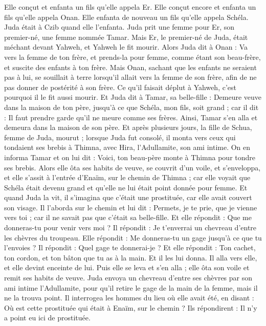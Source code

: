 \begin{multicols}{2}
Elle conçut et enfanta un fils qu'elle appela Er.
Elle conçut encore et enfanta un fils qu'elle appela Onan.
Elle enfanta de nouveau un fils qu'elle appela Schéla. Juda était à Czib quand elle l'enfanta.
Juda prit une femme pour Er, son premier-né, une femme nommée Tamar.
Mais Er, le premier-né de Juda, était méchant devant Yahweh, et Yahweh le fit mourir.
Alors Juda dit à Onan : Va vers la femme de ton frère, et prends-la pour femme, comme étant son beau-frère, et suscite des enfants à ton frère.
Mais Onan, sachant que les enfants ne seraient pas à lui, se souillait à terre lorsqu'il allait vers la femme de son frère, afin de ne pas donner de postérité à son frère.
Ce qu'il faisait déplut à Yahweh, c'est pourquoi il le fit aussi mourir.
Et Juda dit à Tamar, sa belle-fille : Demeure veuve dans la maison de ton père, jusqu'à ce que Schéla, mon fils, soit grand ; car il dit : Il faut prendre garde qu'il ne meure comme ses frères. Ainsi, Tamar s'en alla et demeura dans la maison de son père.
Et après plusieurs jours, la fille de Schua, femme de Juda, mourut ; lorsque Juda fut consolé, il monta vers ceux qui tondaient ses brebis à Thimna, avec Hira, l'Adullamite, son ami intime.
On en informa Tamar et on lui dit : Voici, ton beau-père monte à Thimna pour tondre ses brebis.
Alors elle ôta ses habits de veuve, se couvrit d'un voile, et s'enveloppa, et elle s'assit à l'entrée d'Enaïm, sur le chemin de Thimna ; car elle voyait que Schéla était devenu grand et qu'elle ne lui était point donnée pour femme.
Et quand Juda la vit, il s'imagina que c'était une prostituée, car elle avait couvert son visage.
Il l'aborda sur le chemin et lui dit : Permets, je te prie, que je vienne vers toi ; car il ne savait pas que c'était sa belle-fille. Et elle répondit : Que me donneras-tu pour venir vers moi ?
Il répondit : Je t'enverrai un chevreau d'entre les chèvres du troupeau. Elle répondit : Me donneras-tu un gage jusqu'à ce que tu l'envoies ?
Il répondit : Quel gage te donnerai-je ? Et elle répondit : Ton cachet, ton cordon, et ton bâton que tu as à la main. Et il les lui donna. Il alla vers elle, et elle devint enceinte de lui.
Puis elle se leva et s'en alla ; elle ôta son voile et remit ses habits de veuve.
Juda envoya un chevreau d'entre ses chèvres par son ami intime l'Adullamite, pour qu'il retire le gage de la main de la femme, mais il ne la trouva point.
Il interrogea les hommes du lieu où elle avait été, en disant : Où est cette prostituée qui était à Enaïm, sur le chemin ? Ils répondirent : Il n'y a point eu ici de prostituée.

\end{multicols}

